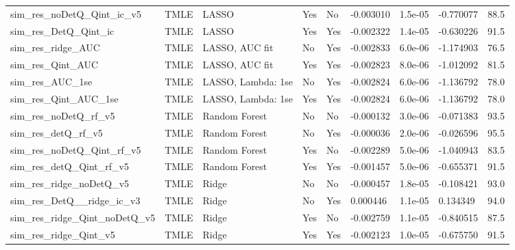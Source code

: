 \begin{longtable}[l]{lllllllll}
\midrule
sim\_res\_noDetQ\_Qint\_ic\_v5 & TMLE & LASSO & Yes & No & -0.003010 & 1.5e-05 & -0.770077 & 88.5\\
sim\_res\_DetQ\_Qint\_ic & TMLE & LASSO & Yes & Yes & -0.002322 & 1.4e-05 & -0.630226 & 91.5\\
sim\_res\_ridge\_AUC & TMLE & LASSO, AUC fit & No & Yes & -0.002833 & 6.0e-06 & -1.174903 & 76.5\\
sim\_res\_Qint\_AUC & TMLE & LASSO, AUC fit & Yes & Yes & -0.002823 & 8.0e-06 & -1.012092 & 81.5\\
sim\_res\_AUC\_1se & TMLE & LASSO, Lambda: 1se & No & Yes & -0.002824 & 6.0e-06 & -1.136792 & 78.0\\
sim\_res\_Qint\_AUC\_1se & TMLE & LASSO, Lambda: 1se & Yes & Yes & -0.002824 & 6.0e-06 & -1.136792 & 78.0\\
sim\_res\_noDetQ\_rf\_v5 & TMLE & Random Forest & No & No & -0.000132 & 3.0e-06 & -0.071383 & 93.5\\
sim\_res\_detQ\_rf\_v5 & TMLE & Random Forest & No & Yes & -0.000036 & 2.0e-06 & -0.026596 & 95.5\\
sim\_res\_noDetQ\_Qint\_rf\_v5 & TMLE & Random Forest & Yes & No & -0.002289 & 5.0e-06 & -1.040943 & 83.5\\
sim\_res\_detQ\_Qint\_rf\_v5 & TMLE & Random Forest & Yes & Yes & -0.001457 & 5.0e-06 & -0.655371 & 91.5\\
sim\_res\_ridge\_noDetQ\_v5 & TMLE & Ridge & No & No & -0.000457 & 1.8e-05 & -0.108421 & 93.0\\
sim\_res\_DetQ\_\_ridge\_ic\_v3 & TMLE & Ridge & No & Yes & 0.000446 & 1.1e-05 & 0.134349 & 94.0\\
sim\_res\_ridge\_Qint\_noDetQ\_v5 & TMLE & Ridge & Yes & No & -0.002759 & 1.1e-05 & -0.840515 & 87.5\\
sim\_res\_ridge\_Qint\_v5 & TMLE & Ridge & Yes & Yes & -0.002123 & 1.0e-05 & -0.675750 & 91.5\\
\bottomrule
\end{longtable}
